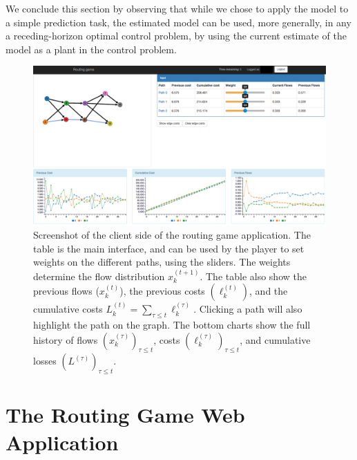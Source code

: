 \documentclass{sig-alternate-ipsn13}
\begin{document}
We conclude this section by observing that while we chose to apply the model to a simple prediction task, the estimated model can be used, more generally, in any a receding-horizon optimal control problem, by using the current estimate of the model as a plant in the control problem.
\begin{figure}
\centering
\includegraphics[width=.80\textwidth]{images/user_interface.pdf}
\caption{\footnotesize Screenshot of the client side of the routing game application. The table is the main interface, and can be used by the player to set weights on the different paths, using the sliders. The weights determine the flow distribution $x^{(t+1)}_k$. The table also show the previous flows ($x^{(t)}_k$), the previous costs $(\ell^{(t)}_k)$, and the cumulative costs $L^{(t)}_k = \sum_{\tau \leq t} \ell^{(\tau)}_k$. Clicking a path will also highlight the path on the graph. The bottom charts show the full history of flows $(x^{(\tau)}_k)_{\tau \leq t}$, costs $(\ell^{(\tau)}_k)_{\tau \leq t}$, and cumulative losses $(L^{(\tau)})_{\tau \leq t}$.}
\label{fig:game_interface}
\label{fig:system_block_diagram}
\end{figure}
\section{The Routing Game Web Application}
\label{sec:experiment}

\end{document}
